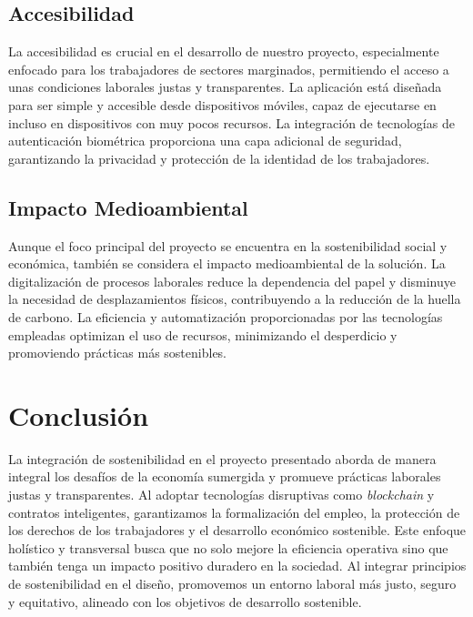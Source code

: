 \subsection{Accesibilidad}

La accesibilidad es crucial en el desarrollo de nuestro proyecto, especialmente enfocado para los trabajadores de sectores marginados, permitiendo el acceso a unas condiciones laborales justas y transparentes.
La aplicación está diseñada para ser simple y accesible desde dispositivos móviles, capaz de ejecutarse en
incluso en dispositivos con muy pocos recursos.
La integración de tecnologías de autenticación biométrica proporciona una capa adicional de seguridad, garantizando la privacidad y protección de la identidad de los trabajadores. 


\subsection{Impacto Medioambiental}

Aunque el foco principal del proyecto se encuentra en la sostenibilidad social y económica, también se considera el impacto medioambiental de la solución. 
La digitalización de procesos laborales reduce la dependencia del papel y disminuye la necesidad de
desplazamientos físicos, contribuyendo a la reducción de la huella de carbono. La eficiencia y automatización proporcionadas por las tecnologías empleadas optimizan el uso de recursos, minimizando el desperdicio y promoviendo prácticas más sostenibles.

\section{Conclusión}

La integración de sostenibilidad en el proyecto presentado aborda de manera integral los desafíos de la economía sumergida y promueve prácticas laborales justas y transparentes. Al adoptar tecnologías disruptivas como \textit{blockchain} y contratos inteligentes, garantizamos la formalización del empleo, la protección de los derechos de los trabajadores y el desarrollo económico sostenible. 
Este enfoque holístico y transversal busca que no solo mejore la eficiencia operativa sino que también tenga un impacto positivo duradero en la sociedad. Al integrar principios de sostenibilidad en el diseño, promovemos un entorno laboral más justo, seguro y equitativo, alineado con los objetivos de desarrollo sostenible.